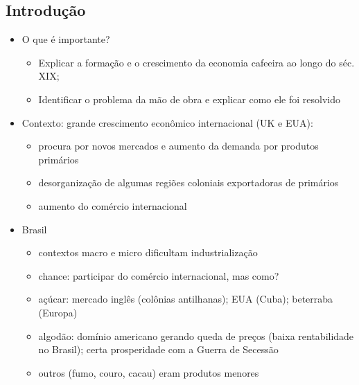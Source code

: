 \documentclass[a4paper,12pt]{article}[abntex2]
\begin{document}
\subsection{\textbf{Introdução}}
\begin{itemize}
    \item O que é importante? 
    \begin{itemize}
        \item Explicar a formação e o crescimento da economia cafeeira ao longo do séc. XIX;
\item Identificar o problema da mão de obra e explicar como ele foi resolvido
    \end{itemize}
    \item Contexto: grande crescimento econômico internacional (UK e EUA):
    \begin{itemize}
        \item procura por novos mercados e aumento da demanda por produtos primários
        \item desorganização de algumas regiões coloniais exportadoras de primários
        \item aumento do comércio internacional
    \end{itemize}
\item Brasil 
\begin{itemize}
    \item contextos macro e micro dificultam
industrialização
\item chance: participar do comércio internacional, mas como?
\item açúcar: mercado inglês (colônias antilhanas); EUA (Cuba); beterraba (Europa)
\item algodão: domínio americano gerando queda de preços (baixa rentabilidade no Brasil); certa
prosperidade com a Guerra de Secessão
\item outros (fumo, couro, cacau) eram produtos menores
\end{itemize}
\end{itemize}
\end{document}
